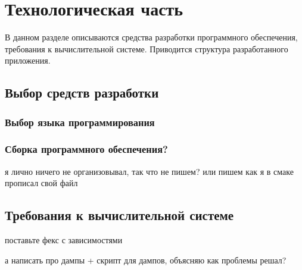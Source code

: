 \section{Технологическая часть}

В данном разделе описываются средства разработки программного обеспечения, требования к вычислительной системе. Приводится структура разработанного приложения.

\subsection{Выбор средств разработки}

\subsubsection{Выбор языка программирования}

\subsubsection{Сборка программного обеспечения?}

я лично ничего не организовывал, так что не пишем? или пишем как я в смаке прописал свой файл

\subsection{Требования к вычислительной системе}

поставьте фекс с зависимостями

а написать про дампы + скрипт для дампов, объясняю как проблемы решал?

\pagebreak
